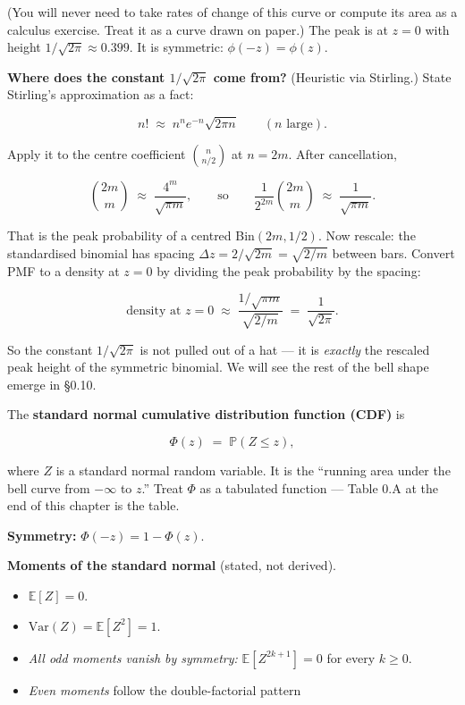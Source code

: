 \documentclass[
  10pt,
  twoside]{book}
\providecommand{\tightlist}{%
  \setlength{\itemsep}{0pt}\setlength{\parskip}{0pt}}
\begin{document}
(You will never need to take rates of change of this curve or compute
its area as a calculus exercise. Treat it as a curve drawn on paper.)
The peak is at \(z = 0\) with height \(1/\sqrt{2\pi} \approx 0.399\). It
is symmetric: \(\phi(-z) = \phi(z)\).

\textbf{Where does the constant \(1/\sqrt{2\pi}\) come from?} (Heuristic
via Stirling.) State Stirling's approximation as a fact:

\[n! \;\approx\; n^n e^{-n} \sqrt{2\pi n} \qquad (n \text{ large}).\]

Apply it to the centre coefficient \(\binom{n}{n/2}\) at \(n = 2m\).
After cancellation,

\[\binom{2m}{m} \;\approx\; \frac{4^m}{\sqrt{\pi m}}, \qquad \text{so} \qquad \frac{1}{2^{2m}} \binom{2m}{m} \;\approx\; \frac{1}{\sqrt{\pi m}}.\]

That is the peak probability of a centred Bin\((2m, 1/2)\). Now rescale:
the standardised binomial has spacing
\(\Delta z = 2/\sqrt{2m} = \sqrt{2/m}\) between bars. Convert PMF to a
density at \(z = 0\) by dividing the peak probability by the spacing:

\[\text{density at } z = 0 \;\approx\; \frac{1/\sqrt{\pi m}}{\sqrt{2/m}} \;=\; \frac{1}{\sqrt{2\pi}}.\]

So the constant \(1/\sqrt{2\pi}\) is not pulled out of a hat --- it is
\emph{exactly} the rescaled peak height of the symmetric binomial. We
will see the rest of the bell shape emerge in §0.10.

The \textbf{standard normal cumulative distribution function (CDF)} is

\[\Phi(z) \;=\; \mathbb{P}(Z \leq z),\]

where \(Z\) is a standard normal random variable. It is the ``running
area under the bell curve from \(-\infty\) to \(z\).'' Treat \(\Phi\) as
a tabulated function --- Table 0.A at the end of this chapter is the
table.

\textbf{Symmetry:} \(\Phi(-z) = 1 - \Phi(z)\).

\textbf{Moments of the standard normal} (stated, not derived).

\begin{itemize}
\tightlist
\item
  \(\mathbb{E}[Z] = 0\).
\item
  \(\mathrm{Var}(Z) = \mathbb{E}[Z^2] = 1\).
\item
  \emph{All odd moments vanish by symmetry:}
  \(\mathbb{E}[Z^{2k+1}] = 0\) for every \(k \geq 0\).
\item
  \emph{Even moments} follow the double-factorial pattern
\end{itemize}
\end{document}

